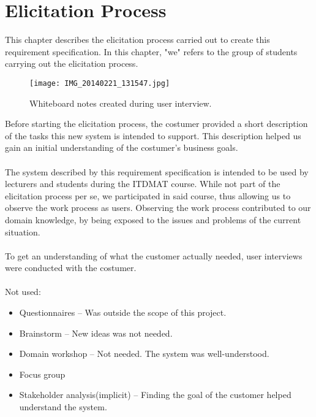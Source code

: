 \documentclass[Main]{subfiles}
\begin{document}
\chapter{Elicitation Process}\label{cha:Elicitation}

This chapter describes the elicitation process carried out to create this requirement specification. 
In this chapter, "we" refers to the group of students carrying out the elicitation process.
\\

\begin{wrapfigure}{r}{0.6\textwidth}
\vspace{-20pt}
\begin{center}
\texttt{[image: IMG\_20140221\_131547.jpg]}
\vspace{-5pt}
\end{center}
\vspace{-10pt}
\caption{Whiteboard notes created during user interview.}
\label{fig:UserInterviewNotes}
\vspace{-10pt}
\end{wrapfigure}

Before starting the elicitation process, the costumer provided a short description of the tasks this new system is intended to support. 
This description helped us gain an initial understanding of the costumer's business goals.
\\
\\
The system described by this requirement specification is intended to be used by lecturers and students during the ITDMAT course. 
While not part of the elicitation process per se, we participated in said course, thus allowing us to observe the work process as users. 
Observing the work process contributed to our domain knowledge, by being exposed to the issues and problems of the current situation.
\\
\\
To get an understanding of what the customer actually needed, user interviews were conducted with the costumer. 
\\
\\
Not used:
\begin{itemize}
\item Questionnaires -- Was outside the scope of this project.
\item Brainstorm -- New ideas was not needed.
\item Domain workshop -- Not needed. The system was well-understood.
\item Focus group
\item Stakeholder analysis(implicit) -- Finding the goal of the customer helped understand the system.
\end{itemize}
\end{document}

